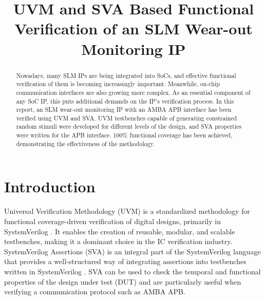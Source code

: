 \documentclass[conference]{IEEEtran}
\begin{document}
\title{UVM and SVA Based Functional Verification of an SLM Wear-out Monitoring IP}

\author{
}

\maketitle

\begin{abstract}
    Nowadays, many SLM IPs are being integrated into SoCs, and effective functional verification of them is becoming increasingly important. Meanwhile, on-chip communication interfaces are also growing more complex. As an essential component of any SoC IP, this puts additional demands on the IP's verification process. In this report, an SLM wear-out monitoring IP with an AMBA APB interface has been verified using UVM and SVA. UVM testbenches capable of generating constrained random stimuli were developed for different levels of the design, and SVA properties were written for the APB interface. 100\% functional coverage has been achieved, demonstrating the effectiveness of the methodology.
 \end{abstract}
 
 
 \section{Introduction}
 Universal Verification Methodology (UVM) is a standardized methodology for functional coverage-driven verification of digital designs, primarily in SystemVerilog \cite{UVM}. It enables the creation of reusable, modular, and scalable testbenches, making it a dominant choice in the IC verification industry. SystemVerilog Assertions (SVA) is an integral part of the SystemVerilog language that provides a well-structured way of integrating assertions into testbenches written in SystemVerilog \cite{SV}. SVA can be used to check the temporal and functional properties of the design under test (DUT) and are particularly useful when verifying a communication protocol such as AMBA APB.
 
\end{document}
